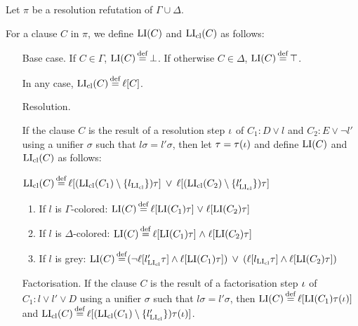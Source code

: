 \documentclass[,%
	draft=false,%
	numbers=noendperiod
	11pt,
	a4paper,
	oneside,%
	openany,
]{memoir}
\begin{document}
\begin{defi}
	Let $\pi$ be a resolution refutation of $\Gamma \cup \Delta$.

	For a clause $C$ in $\pi$, 
	we define $\operatorname{LI}(C)$ and $\operatorname{LI}_{\operatorname{cl}}(C)$ as follows:
	~

	\begin{itemize}
		\item[Base case.]
			If $C \in \Gamma$, $\operatorname{LI}(C) \operatorname{\stackrel{\mathrm{def}}{=}} \bot$.
			If otherwise $C \in \Delta$, $\operatorname{LI}(C) \operatorname{\stackrel{\mathrm{def}}{=}} \top$.

			In any case, $\operatorname{LI}_{\operatorname{cl}}(C) \operatorname{\stackrel{\mathrm{def}}{=}} \ell[C]$.
		\item[Resolution.]

			If the clause $C$ is the result of a resolution step $\iota$ of $C_1: D \lor l$ and $C_2: E \lor \lnot l'$ using a unifier $\sigma$ such that $l\sigma =  l'\sigma$, then let $\tau = \tau(\iota)$ and define $\operatorname{LI}(C)$ and $\operatorname{LI}_{\operatorname{cl}}(C)$ as follows:

			$\operatorname{LI}_{\operatorname{cl}}(C) \operatorname{\stackrel{\mathrm{def}}{=}} \ell[(\operatorname{LI}_{\operatorname{cl}}(C_1) \setminus \{l_{\operatorname{LI}_{\operatorname{cl}}}\})\tau] \;\,{\lor}\;\, \ell[(\operatorname{LI}_{\operatorname{cl}}(C_2)\setminus \{l_{\operatorname{LI}_{\operatorname{cl}}}'\})\tau] $

			\begin{enumerate}

				\item If $l$ is $\Gamma$-colored:
					$\operatorname{LI}(C) \operatorname{\stackrel{\mathrm{def}}{=}} \ell[\operatorname{LI}(C_1)\tau]\;{\lor}\; \ell[\operatorname{LI}(C_2)\tau] $

				\item If $l$ is $\Delta$-colored:
					$\operatorname{LI}(C) \operatorname{\stackrel{\mathrm{def}}{=}} \ell[\operatorname{LI}(C_1)\tau]\;{\land}\; \ell[\operatorname{LI}(C_2)\tau] $

				\item If $l$ is grey:
					$\operatorname{LI}(C) \operatorname{\stackrel{\mathrm{def}}{=}}
					(\lnot {\ell[l'\ensuremath{_{\operatorname{LI}_{\operatorname{cl}}}}\tau]} \land \ell[\operatorname{LI}(C_1)\tau]) \;\,{\lor}\;\,
					(\ell[l_{\operatorname{LI}_{\operatorname{cl}}}\tau]\land \ell[\operatorname{LI}(C_2)\tau ])
					$

			\end{enumerate}

		\item[Factorisation.]
			If the clause $C$ is the result of a factorisation step $\iota$ of $C_1: l \lor l' \lor D$ using a unifier $\sigma$ such that $l\sigma = l'\sigma$, then $\operatorname{LI}(C) \operatorname{\stackrel{\mathrm{def}}{=}} \ell[\operatorname{LI}(C_1)\tau(\iota)]$ and $\lifiboth{C} \defeq \lifboth{ (\lifiboth{C_1} \setminus\nolinebreak \{l'\cll\})\tau(\inference)}$.
			\qedhere

	\end{itemize}

\end{defi}
\end{document}
